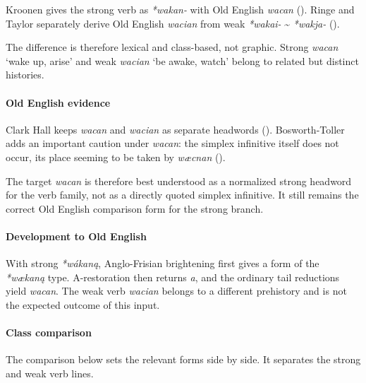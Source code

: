 \documentclass[
  british,
  a4paper,
]{article}
\begin{document}
Kroonen gives the strong verb as \emph{*wakan-} with Old English
\emph{wacan} (). Ringe and
Taylor separately derive Old English \emph{wacian} from weak
\emph{*wakai-} \textasciitilde{} \emph{*wakja-}
().

The difference is therefore lexical and class-based, not graphic. Strong
\emph{wacan} `wake up, arise' and weak \emph{wacian} `be awake, watch'
belong to related but distinct histories.

\paragraph{Old English evidence}\label{old-english-evidence-32}

Clark Hall keeps \emph{wacan} and \emph{wacian} as separate headwords
(). Bosworth-Toller
adds an important caution under \emph{wacan}: the simplex infinitive
itself does not occur, its place seeming to be taken by \emph{wæcnan}
().

The target \emph{wacan} is therefore best understood as a normalized
strong headword for the verb family, not as a directly quoted simplex
infinitive. It still remains the correct Old English comparison form for
the strong branch.

\paragraph{Development to Old
English}\label{development-to-old-english-32}

With strong \emph{*wákaną}, Anglo-Frisian brightening first gives a form
of the \emph{*wækaną} type. A-restoration then returns \emph{a}, and the
ordinary tail reductions yield \emph{wacan}. The weak verb \emph{wacian}
belongs to a different prehistory and is not the expected outcome of
this input.

\paragraph{Class comparison}\label{class-comparison-4}

The comparison below sets the relevant forms side by side. It separates
the strong and weak verb lines.
\end{document}
